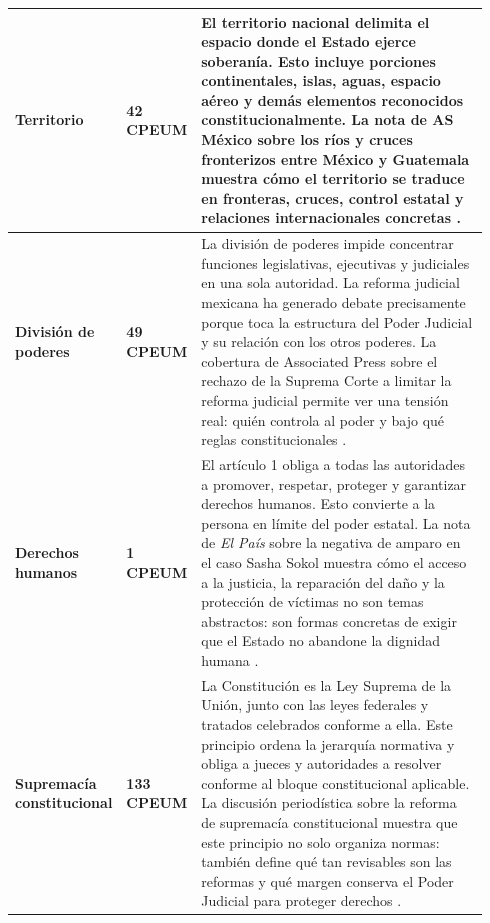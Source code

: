 \documentclass[
spanish,
letterpaper, oneside
]{article}
\begin{document}
\begin{longtable}{@{}P{0.18\linewidth}P{0.14\linewidth}P{0.62\linewidth}@{}}
		\textbf{Territorio} &
		\textbf{42 CPEUM} &
		El territorio nacional delimita el espacio donde el Estado ejerce soberanía. Esto incluye porciones continentales, islas, aguas, espacio aéreo y demás elementos reconocidos constitucionalmente. La nota de AS México sobre los ríos y cruces fronterizos entre México y Guatemala muestra cómo el territorio se traduce en fronteras, cruces, control estatal y relaciones internacionales concretas \citep{cpeum2026,trejo2024guatemala}. \\
		\midrule
		
		\textbf{División de poderes} &
		\textbf{49 CPEUM} &
		La división de poderes impide concentrar funciones legislativas, ejecutivas y judiciales en una sola autoridad. La reforma judicial mexicana ha generado debate precisamente porque toca la estructura del Poder Judicial y su relación con los otros poderes. La cobertura de Associated Press sobre el rechazo de la Suprema Corte a limitar la reforma judicial permite ver una tensión real: quién controla al poder y bajo qué reglas constitucionales \citep{cpeum2026,ap2024judicial}. \\
		\midrule
		
		\textbf{Derechos humanos} &
		\textbf{1 CPEUM} &
		El artículo 1 obliga a todas las autoridades a promover, respetar, proteger y garantizar derechos humanos. Esto convierte a la persona en límite del poder estatal. La nota de \textit{El País} sobre la negativa de amparo en el caso Sasha Sokol muestra cómo el acceso a la justicia, la reparación del daño y la protección de víctimas no son temas abstractos: son formas concretas de exigir que el Estado no abandone la dignidad humana \citep{cpeum2026,elpais2025sokol}. \\
		\midrule
		
		\textbf{Supremacía constitucional} &
		\textbf{133 CPEUM} &
		La Constitución es la Ley Suprema de la Unión, junto con las leyes federales y tratados celebrados conforme a ella. Este principio ordena la jerarquía normativa y obliga a jueces y autoridades a resolver conforme al bloque constitucional aplicable. La discusión periodística sobre la reforma de supremacía constitucional muestra que este principio no solo organiza normas: también define qué tan revisables son las reformas y qué margen conserva el Poder Judicial para proteger derechos \citep{cpeum2026,elfinanciero2024supremacia}. \\
		
	\end{longtable}
	\endgroup
	
\end{document}

